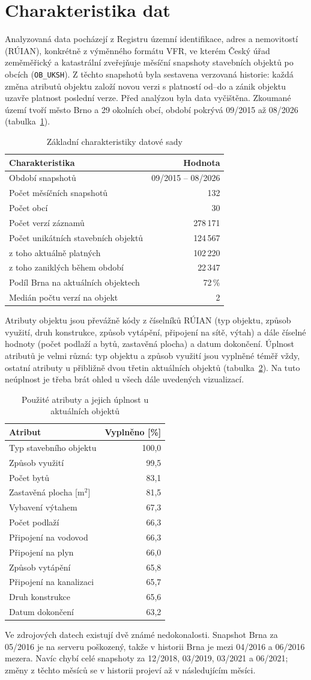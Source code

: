 \section{Charakteristika dat}

Analyzovaná data pocházejí z Registru územní identifikace, adres a nemovitostí
(RÚIAN), konkrétně z výměnného formátu VFR, ve kterém Český úřad zeměměřický
a katastrální zveřejňuje měsíční snapshoty stavebních objektů po obcích
(\texttt{OB\_UKSH}). Z těchto snapshotů byla sestavena verzovaná historie:
každá změna atributů objektu založí novou verzi s platností od--do a zánik
objektu uzavře platnost poslední verze. Před analýzou byla data vyčištěna.
Zkoumané území tvoří město Brno a 29 okolních obcí, období pokrývá
09/2015 až 08/2026 (tabulka~\ref{tab:zakladni}).

\begin{table}[htbp]
\centering
\caption{Základní charakteristiky datové sady}
\label{tab:zakladni}
\begin{tabular}{l|r}
Charakteristika & Hodnota \tabularnewline \hline
Období snapshotů & 09/2015 -- 08/2026 \tabularnewline \hline
Počet měsíčních snapshotů & 132 \tabularnewline \hline
Počet obcí & 30 \tabularnewline \hline
Počet verzí záznamů & 278\,171 \tabularnewline \hline
Počet unikátních stavebních objektů & 124\,567 \tabularnewline \hline
\quad z toho aktuálně platných & 102\,220 \tabularnewline \hline
\quad z toho zaniklých během období & 22\,347 \tabularnewline \hline
Podíl Brna na aktuálních objektech & 72\,\% \tabularnewline \hline
Medián počtu verzí na objekt & 2 \tabularnewline
\end{tabular}
\end{table}

Atributy objektu jsou převážně kódy z číselníků RÚIAN (typ objektu, způsob
využití, druh konstrukce, způsob vytápění, připojení na sítě, výtah) a dále
číselné hodnoty (počet podlaží a bytů, zastavěná plocha) a datum dokončení.
Úplnost atributů je velmi různá: typ objektu a způsob využití jsou vyplněné
téměř vždy, ostatní atributy u přibližně dvou třetin aktuálních objektů
(tabulka~\ref{tab:atributy}). Na tuto neúplnost je třeba brát ohled
u všech dále uvedených vizualizací.

\begin{table}[htbp]
\centering
\caption{Použité atributy a jejich úplnost u aktuálních objektů}
\label{tab:atributy}
\begin{tabular}{l|r}
Atribut & Vyplněno [\%] \tabularnewline \hline
Typ stavebního objektu & 100,0 \tabularnewline \hline
Způsob využití & 99,5 \tabularnewline \hline
Počet bytů & 83,1 \tabularnewline \hline
Zastavěná plocha [m$^2$] & 81,5 \tabularnewline \hline
Vybavení výtahem & 67,3 \tabularnewline \hline
Počet podlaží & 66,3 \tabularnewline \hline
Připojení na vodovod & 66,3 \tabularnewline \hline
Připojení na plyn & 66,0 \tabularnewline \hline
Způsob vytápění & 65,8 \tabularnewline \hline
Připojení na kanalizaci & 65,7 \tabularnewline \hline
Druh konstrukce & 65,6 \tabularnewline \hline
Datum dokončení & 63,2 \tabularnewline
\end{tabular}
\end{table}

Ve zdrojových datech existují dvě známé nedokonalosti. Snapshot Brna za
05/2016 je na serveru poškozený, takže v historii Brna je mezi 04/2016
a 06/2016 mezera. Navíc chybí celé snapshoty za 12/2018, 03/2019, 03/2021
a 06/2021; změny z těchto měsíců se v historii projeví až v následujícím
měsíci.
